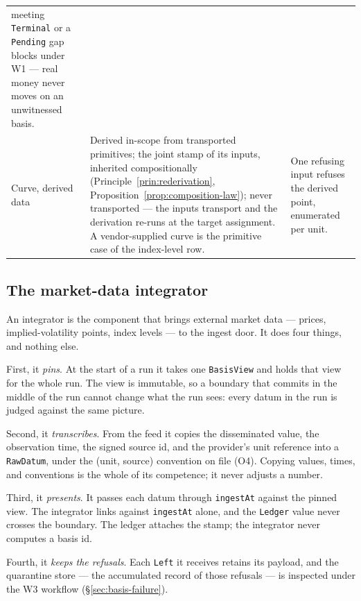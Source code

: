 \begin{center}
\begin{longtable}{@{}p{2.4cm} p{5.6cm} p{5.5cm}@{}}
meeting \texttt{Terminal} or a \texttt{Pending} gap blocks under W1 --- real money
never moves on an unwitnessed basis. \\
\addlinespace
Curve, derived data & Derived in-scope from transported primitives; the joint stamp
of its inputs, inherited compositionally (Principle~\ref{prin:rederivation},
Proposition~\ref{prop:composition-law}); never transported --- the inputs transport
and the derivation re-runs at the target assignment. A vendor-supplied curve
is the primitive case of the index-level row. & One refusing input refuses the
derived point, enumerated per unit. \\
\bottomrule
\end{longtable}
\end{center}

\subsection{The market-data integrator}
\label{sec:basis-integrator}

An integrator is the component that brings external market data --- prices,
implied-volatility points, index levels --- to the ingest door. It does four
things, and nothing else.

First, it \emph{pins}. At the start of a run it takes one \texttt{BasisView}
and holds that view for the whole run. The view is immutable, so a boundary
that commits in the middle of the run cannot change what the run sees: every
datum in the run is judged against the same picture.

Second, it \emph{transcribes}. From the feed it copies the disseminated value,
the observation time, the signed source id, and the provider's unit reference
into a \texttt{RawDatum}, under the (unit, source) convention on file (O4).
Copying values, times, and conventions is the whole of its competence; it never
adjusts a number.

Third, it \emph{presents}. It passes each datum through \texttt{ingestAt}
against the pinned view. The integrator links against \texttt{ingestAt} alone,
and the \texttt{Ledger} value never crosses the boundary. The ledger attaches
the stamp; the integrator never computes a basis id.

Fourth, it \emph{keeps the refusals}. Each \texttt{Left} it receives retains
its payload, and the quarantine store --- the accumulated record of those
refusals --- is inspected under the W3 workflow
(\S\ref{sec:basis-failure}).

